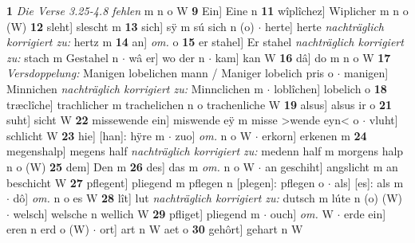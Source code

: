 \documentclass[8pt,a4paper,notitlepage]{article}
\begin{document}
\begin{table}[ht]
\begin{minipage}[t]{0.5\linewidth}
\textbf{1} \textit{Die Verse 3.25-4.8 fehlen} m n o W  \textbf{9} Ein] Eine n \textbf{11} wîplîchez] Wiplicher m n o (W) \textbf{12} sleht] slescht m \textbf{13} sich] sÿ m sú sich n (o)  $\cdot$ herte] herte \textit{nachträglich korrigiert zu:} hertz m \textbf{14} an] \textit{om.} o \textbf{15} er stahel] Er stahel \textit{nachträglich korrigiert zu:} stach m Gestahel n  $\cdot$ wâ er] wo der n  $\cdot$ kam] kan W \textbf{16} dâ] do m n o W \textbf{17} \textit{Versdoppelung:} Manigen lobelichen mann / Maniger lobelich pris o   $\cdot$ manigen] Minnichen \textit{nachträglich korrigiert zu:} Minnclichen m  $\cdot$ loblîchen] lobelich o \textbf{18} træclîche] trachlicher m trachelichen n o trachenliche W \textbf{19} alsus] alsus ir o \textbf{21} suht] sicht W \textbf{22} missewende ein] miswende eÿ m misse >wende eyn< o  $\cdot$ vluht] schlicht W \textbf{23} hie] [han]: hÿre m  $\cdot$ zuo] \textit{om.} n o W  $\cdot$ erkorn] erkenen m \textbf{24} megenshalp] megens half \textit{nachträglich korrigiert zu:} medenn half m morgens halp n o (W) \textbf{25} dem] Den m \textbf{26} des] das m \textit{om.} n o W  $\cdot$ an geschiht] angslicht m an beschicht W \textbf{27} pflegent] pliegend m pflegen n [plegen]: pflegen o  $\cdot$ als] [es]: als m  $\cdot$ dô] \textit{om.} n o es W \textbf{28} lît] lut \textit{nachträglich korrigiert zu:} dutsch m lúte n (o) (W)  $\cdot$ welsch] welsche n wellich W \textbf{29} pfliget] pliegend m  $\cdot$ ouch] \textit{om.} W  $\cdot$ erde ein] eren n erd o (W)  $\cdot$ ort] art n W aet o \textbf{30} gehôrt] gehart n W \newline
\end{minipage}
\end{table}
\newpage
\end{document}
